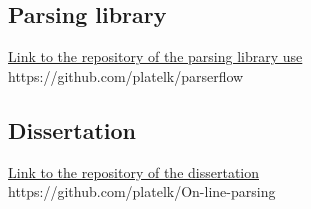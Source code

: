\subsection{Parsing library}
\href{https://github.com/platelk/parserflow}{Link to the repository of the parsing library use}
\\https://github.com/platelk/parserflow
\subsection{Dissertation}
\href{https://github.com/platelk/On-line-parsing}{Link to the repository of the dissertation}
\\https://github.com/platelk/On-line-parsing